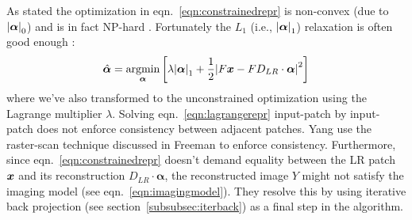As stated the optimization in eqn.~\eqref{eqn:constrainedrepr} is non-convex (due to \(\abs{ \bm{\alpha} }_0\)) and is in fact NP-hard \cite{tilman2015}.
%
Fortunately the \(L_1\) (i.e., \(\abs{ \bm{\alpha} }_1\)) relaxation is often good enough \cite{Donoho9446}:
\begin{equation}
    \hat{\bm{\alpha}} = \underset{\bm{\alpha}}{\text{argmin}} \left[ \lambda\abs{ \bm{\alpha} }_1 + \frac{1}{2}\abs{ F\bm{x} - FD_{LR}\cdot \bm{\alpha} }^2 \right]
    \label{eqn:lagrangerepr}
\end{equation}
where we've also transformed to the unconstrained optimization using the Lagrange multiplier \(\lambda\).
%
Solving eqn.~\eqref{eqn:lagrangerepr} input-patch by input-patch does not enforce consistency between adjacent patches.
%
Yang \etal use the raster-scan technique discussed in Freeman \etal \cite{freeman2002example} to enforce consistency.
%
Furthermore, since eqn.~\eqref{eqn:constrainedrepr} doesn't demand equality between the LR patch \(\bm{x}\) and its reconstruction \(D_{LR}\cdot \bm{\alpha}\), the reconstructed image \(Y\) might not satisfy the imaging model (see eqn.~\eqref{eqn:imagingmodel}).
%
They resolve this by using iterative back projection (see section~\ref{subsubsec:iterback}) as a final step in the algorithm.

